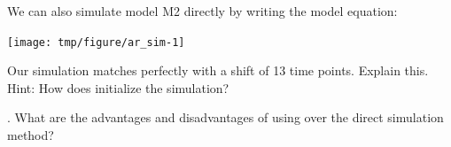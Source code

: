 \begin{frame}[fragile]
We can also simulate model M2 directly by writing the model equation:


\begin{knitrout}\small
{}\color{fgcolor}\begin{kframe}
\begin{alltt}
\hlstd{(}\hlstd{)}
 \hlkwb{<-} 
 \hlkwb{<-} 
\hlstd{X[}\hlstd{]} \hlkwb{<-} \hlstd{(}\hlstd{,}\hlstd{=}\hlstd{(}\hlstd{))}
  \hlopt{:} \hlkwb{<-}  \hlopt{*} \hlstd{X[n}\hlopt{-}\hlstd{]} \hlopt{+} \hlstd{(}\hlstd{)}
\hlstd{=}\hlstd{)}
\hlstd{(}\hlopt{-}\hlstd{),}\hlstd{=}\hlstd{,}\hlstd{=}\hlstd{)}
\end{alltt}
\end{kframe}
\end{knitrout}


\begin{knitrout}\small
{}\color{fgcolor}

\texttt{[image: tmp/figure/ar\_sim-1]} \hfill{}


\end{knitrout}


Our simulation matches  perfectly with a shift of 13 time points. Explain this. Hint: How does  initialize the simulation?

\end{frame} 





\begin{frame}[fragile]


\myquestion. What are the advantages and disadvantages of using  over the direct simulation method?



\end{frame}


